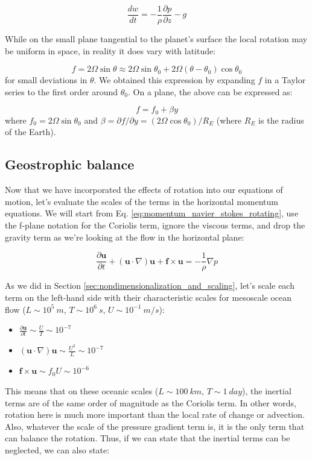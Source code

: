 \documentclass[12pt]{article}
\numberwithin{equation}{section}
\numberwithin{figure}{section}
\numberwithin{table}{section}
\begin{document}
\begin{equation}
  \frac{dw}{dt} = - \frac{1}{\rho} \frac{\partial p}{\partial z} - g
\end{equation}

While on the small plane tangential to the planet's surface the local rotation
may be uniform in space, in reality it does vary with latitude:

\begin{equation}
  f = 2 \Omega \sin\theta \approx 2\Omega \sin\theta_0 + 2\Omega (\theta - \theta_0) \cos\theta_0
\end{equation}
for small deviations in $\theta$.
We obtained this expression by expanding $f$ in a Taylor series to the first
order around $\theta_0$.
On a plane, the above can be expressed as:

\begin{equation}
f = f_0 + \beta y
\label{eq:beta_plane_approximation}
\end{equation}
where $f_0 = 2\Omega \sin\theta_0$ and $\beta = \partial f/\partial y = (2\Omega\cos\theta_0) / R_E$
(where $R_E$ is the radius of the Earth).

\subsection{Geostrophic balance}
\label{sec:geostrophic_balance}

Now that we have incorporated the effects of rotation into our equations of motion,
let's evaluate the scales of the terms in the horizontal momentum equations.
We will start from Eq. \ref{eq:momentum_navier_stokes_rotating}, use the f-plane
notation for the Coriolis term, ignore the viscous terms, and drop the gravity
term as we're looking at the flow in the horizontal plane:

\begin{equation}
  \frac{\partial \mathbf{u}}{\partial t} +
  (\mathbf{u} \cdot \nabla) \mathbf{u} +
  \mathbf{f} \times \mathbf{u} =
  - \frac{1}{\rho} \nabla p
\end{equation}

As we did in Section \ref{sec:nondimensionalization_and_scaling}, let's scale
each term on the left-hand side with their characteristic scales for mesoscale
ocean flow ($L \sim 10^5\ m$, $T \sim 10^6\ s$, $U \sim 10^{-1}\ m/s$):

\begin{itemize}
  \item $\frac{\partial \mathbf{u}}{\partial t} \sim \frac{U}{T} \sim 10^{-7}$
  \item $(\mathbf{u} \cdot \nabla) \mathbf{u} \sim \frac{U^2}{L} \sim 10^{-7}$
  \item $\mathbf{f} \times \mathbf{u} \sim f_0 U \sim 10^{-6}$
\end{itemize}
This means that on these oceanic scales ($L \sim 100\ km$, $T \sim 1\ day$),
the inertial terms are of the same order of magnitude as the Coriolis term.
In other words, rotation here is much more important than the local rate of
change or advection.
Also, whatever the scale of the pressure gradient term is, it is the only
term that can balance the rotation.
Thus, if we can state that the inertial terms can be neglected, we can also
state:
\end{document}
